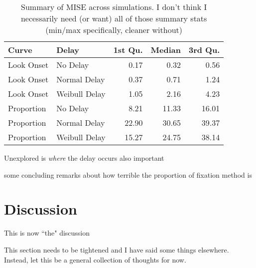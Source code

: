\begin{table}[H]
\centering
\begin{tabular}{llrrr}
  \hline
Curve & Delay & 1st Qu. & Median & 3rd Qu. \\ 
  \hline
Look Onset & No Delay & 0.17 & 0.32 & 0.56 \\ 
  Look Onset & Normal Delay & 0.37 & 0.71 & 1.24 \\ 
  Look Onset & Weibull Delay & 1.05 & 2.16 & 4.23 \\ 
  Proportion & No Delay & 8.21 & 11.33 & 16.01 \\ 
  Proportion & Normal Delay & 22.90 & 30.65 & 39.37 \\ 
  Proportion & Weibull Delay & 15.27 & 24.75 & 38.14 \\ 
   \hline
\end{tabular}
\caption{Summary of MISE across simulations. I don't think I necessarily need (or want) all of those summary stats (min/max specifically, cleaner without)}
\label{tab:mise_sims}
\end{table}

Unexplored is \textit{where} the delay occurs also important

some concluding remarks about how terrible the proportion of fixation method is

\section{Discussion}

This is now ``the" discussion

This section needs to be tightened and I have said some things elsewhere. Instead, let this be a general collection of thoughts for now.



